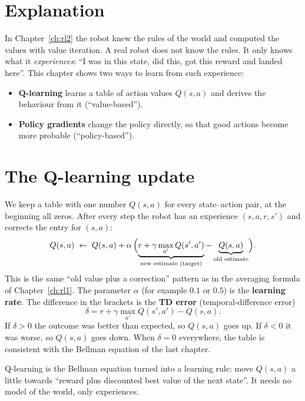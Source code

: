 \label{ch:rl3}

\section*{Explanation}
In Chapter~\ref{ch:rl2} the robot knew the rules of the world and computed the values with value iteration. A real robot does not know the rules. It only knows what it \emph{experiences}: ``I was in this state, did this, got this reward and landed here''. This chapter shows two ways to learn from such experience:
\begin{itemize}[nosep]
  \item \textbf{Q-learning} learns a table of action values $Q(s,a)$ and derives the behaviour from it (``value-based'').
  \item \textbf{Policy gradients} change the policy directly, so that good actions become more probable (``policy-based'').
\end{itemize}

\section*{The Q-learning update}
We keep a table with one number $Q(s,a)$ for every state--action pair, at the beginning all zeros. After every step the robot has an experience $(s,a,r,s')$ and corrects the entry for $(s,a)$:
\[
Q(s,a)\;\leftarrow\;Q(s,a)+\alpha\,\Bigl(\underbrace{r+\gamma\max_{a'}Q(s',a')}_{\text{new estimate (target)}}-\underbrace{Q(s,a)}_{\text{old estimate}}\Bigr).
\]
This is the same ``old value plus a correction'' pattern as in the averaging formula of Chapter~\ref{ch:rl1}. The parameter $\alpha$ (for example $0.1$ or $0.5$) is the \textbf{learning rate}. The difference in the brackets is the \textbf{TD error} (temporal-difference error)
\[
\delta=r+\gamma\max_{a'}Q(s',a')-Q(s,a).
\]
If $\delta>0$ the outcome was better than expected, so $Q(s,a)$ goes up. If $\delta<0$ it was worse, so $Q(s,a)$ goes down. When $\delta=0$ everywhere, the table is consistent with the Bellman equation of the last chapter.

\begin{keyidea}[Q-learning]
Q-learning is the Bellman equation turned into a learning rule: move $Q(s,a)$ a little towards ``reward plus discounted best value of the next state''. It needs no model of the world, only experiences.
\end{keyidea}

